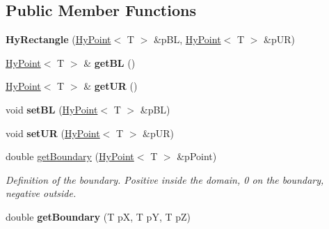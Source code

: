 \subsection*{Public Member Functions}
\begin{DoxyCompactItemize}
\item 
\hypertarget{classHyRectangle_afab85331b1158d1215bac7680e67a456}{
{\bfseries HyRectangle} (\hyperlink{classHyPoint}{HyPoint}$<$ T $>$ \&pBL, \hyperlink{classHyPoint}{HyPoint}$<$ T $>$ \&pUR)}
\label{classHyRectangle_afab85331b1158d1215bac7680e67a456}

\item 
\hypertarget{classHyRectangle_a8a81ae18b51a5580752d524e8f17a4f7}{
\hyperlink{classHyPoint}{HyPoint}$<$ T $>$ \& {\bfseries getBL} ()}
\label{classHyRectangle_a8a81ae18b51a5580752d524e8f17a4f7}

\item 
\hypertarget{classHyRectangle_a49e7757b39e6210905cb82d04b340b0e}{
\hyperlink{classHyPoint}{HyPoint}$<$ T $>$ \& {\bfseries getUR} ()}
\label{classHyRectangle_a49e7757b39e6210905cb82d04b340b0e}

\item 
\hypertarget{classHyRectangle_a615ce12bfbb99d0f83df522e42d83a8d}{
void {\bfseries setBL} (\hyperlink{classHyPoint}{HyPoint}$<$ T $>$ \&pBL)}
\label{classHyRectangle_a615ce12bfbb99d0f83df522e42d83a8d}

\item 
\hypertarget{classHyRectangle_a9b6df049ea762af2fa4fceb5cc2e5750}{
void {\bfseries setUR} (\hyperlink{classHyPoint}{HyPoint}$<$ T $>$ \&pUR)}
\label{classHyRectangle_a9b6df049ea762af2fa4fceb5cc2e5750}

\item 
double \hyperlink{classHyRectangle_a881f7ed847a94d1af3ff4ff0d60ee516}{getBoundary} (\hyperlink{classHyPoint}{HyPoint}$<$ T $>$ \&pPoint)
\begin{DoxyCompactList}\small\item\em Definition of the boundary. Positive inside the domain, 0 on the boundary, negative outside. \item\end{DoxyCompactList}\item 
\hypertarget{classHyRectangle_a96f3c7b970fe67fdea44c2b8fd52cb4a}{
double {\bfseries getBoundary} (T pX, T pY, T pZ)}
\label{classHyRectangle_a96f3c7b970fe67fdea44c2b8fd52cb4a}

\end{DoxyCompactItemize}
